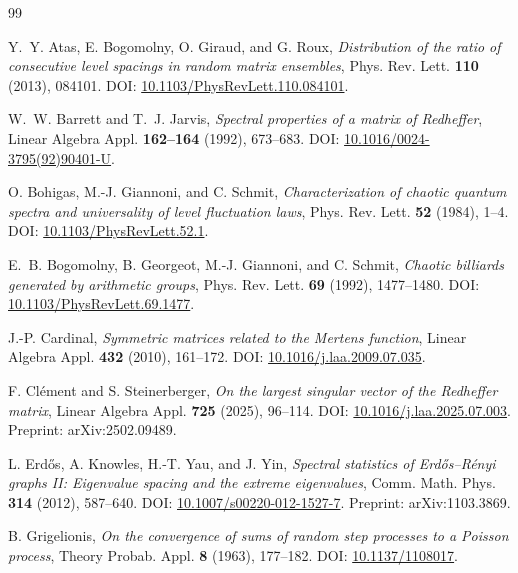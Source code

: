 \documentclass[11pt]{amsart}
\numberwithin{equation}{section}
\theoremstyle{plain}
\theoremstyle{definition}
\theoremstyle{remark}
\begin{document}
\begin{thebibliography}{99}

Y.~Y. Atas, E. Bogomolny, O. Giraud, and G. Roux,
\emph{Distribution of the ratio of consecutive level spacings in random matrix ensembles},
Phys. Rev. Lett. \textbf{110} (2013), 084101.
DOI: \href{https://doi.org/10.1103/PhysRevLett.110.084101}{10.1103/PhysRevLett.110.084101}.

W.~W. Barrett and T.~J. Jarvis,
\emph{Spectral properties of a matrix of Redheffer},
Linear Algebra Appl. \textbf{162--164} (1992), 673--683.
DOI: \href{https://doi.org/10.1016/0024-3795(92)90401-U}{10.1016/0024-3795(92)90401-U}.

O. Bohigas, M.-J. Giannoni, and C. Schmit,
\emph{Characterization of chaotic quantum spectra and universality of level fluctuation laws},
Phys. Rev. Lett. \textbf{52} (1984), 1--4.
DOI: \href{https://doi.org/10.1103/PhysRevLett.52.1}{10.1103/PhysRevLett.52.1}.

E.~B. Bogomolny, B. Georgeot, M.-J. Giannoni, and C. Schmit,
\emph{Chaotic billiards generated by arithmetic groups},
Phys. Rev. Lett. \textbf{69} (1992), 1477--1480.
DOI: \href{https://doi.org/10.1103/PhysRevLett.69.1477}{10.1103/PhysRevLett.69.1477}.

J.-P. Cardinal,
\emph{Symmetric matrices related to the Mertens function},
Linear Algebra Appl. \textbf{432} (2010), 161--172.
DOI: \href{https://doi.org/10.1016/j.laa.2009.07.035}{10.1016/j.laa.2009.07.035}.

F. Cl\'ement and S. Steinerberger,
\emph{On the largest singular vector of the Redheffer matrix},
Linear Algebra Appl. \textbf{725} (2025), 96--114.
DOI: \href{https://doi.org/10.1016/j.laa.2025.07.003}{10.1016/j.laa.2025.07.003}.
Preprint: arXiv:2502.09489.

L. Erd\H{o}s, A. Knowles, H.-T. Yau, and J. Yin,
\emph{Spectral statistics of Erd\H{o}s--R\'enyi graphs II: Eigenvalue spacing and the extreme eigenvalues},
Comm. Math. Phys. \textbf{314} (2012), 587--640.
DOI: \href{https://doi.org/10.1007/s00220-012-1527-7}{10.1007/s00220-012-1527-7}.
Preprint: arXiv:1103.3869.

B. Grigelionis,
\emph{On the convergence of sums of random step processes to a Poisson process},
Theory Probab. Appl. \textbf{8} (1963), 177--182.
DOI: \href{https://doi.org/10.1137/1108017}{10.1137/1108017}.


\end{thebibliography}
\end{document}
